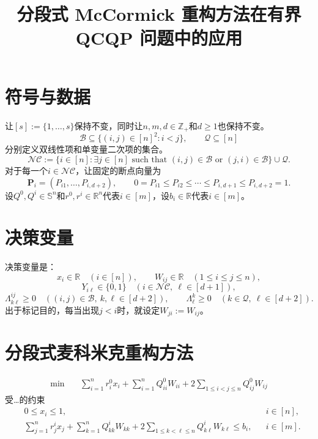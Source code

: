 \documentclass{article}
\title{分段式 McCormick 重构方法在有界 QCQP 问题中的应用}
\author{}
\date{}
\begin{document}
\maketitle

\section*{符号与数据}
让$[s]:=\{1,\ldots,s\}$保持不变，同时让$n,m,d\in\mathbb{Z}_{+}$和$d\geq 1$也保持不变。
\[
\mathcal{B}\subseteq\{(i,j)\in[n]^2:i<j\},
\qquad
\mathcal{Q}\subseteq[n]
\]
分别定义双线性项和单变量二次项的集合。
\[
\mathcal{NC}:=
\bigl\{i\in[n]:\exists j\in[n]\text{ such that }(i,j)\in\mathcal{B}\text{ or }(j,i)\in\mathcal{B}\bigr\}\cup\mathcal{Q}.
\]
对于每一个$i\in\mathcal{NC}$，让固定的断点向量为
\[
\mathbf{P}_i=(P_{i1},\ldots,P_{i,d+2}),
\qquad
0=P_{i1}\leq P_{i2}\leq\cdots\leq P_{i,d+1}\leq P_{i,d+2}=1.
\]
设$Q^0,Q^i\in\mathbb{S}^n$和$r^0,r^i\in\mathbb{R}^n$代表$i\in[m]$，设$b_i\in\mathbb{R}$代表$i\in[m]$。

\section*{决策变量}
决策变量是：
\[
x_i\in\mathbb{R}\quad(i\in[n]),
\qquad
W_{ij}\in\mathbb{R}\quad(1\leq i\leq j\leq n),
\]
\[
Y_{i\ell}\in\{0,1\}\quad(i\in\mathcal{NC},\ \ell\in[d+1]),
\]
\[
\Lambda^{ij}_{k\ell}\geq 0
\quad((i,j)\in\mathcal{B},\ k,\ell\in[d+2]),
\qquad
\Lambda^k_\ell\geq 0
\quad(k\in\mathcal{Q},\ \ell\in[d+2]).
\]
出于标记目的，每当出现$j<i$时，就设定$W_{ji}:=W_{ij}$。

\section*{分段式麦科米克重构方法}
\begin{align}
\min\quad
&\sum_{i=1}^{n}r^0_i x_i
 +\sum_{i=1}^{n}Q^0_{ii}W_{ii}
 +2\sum_{1\leq i<j\leq n}Q^0_{ij}W_{ij}
\label{eq:objective}
\end{align}
受…的约束
\begin{align}
&0\leq x_i\leq 1,
&& i\in[n],
\label{eq:xbounds}\\
&\sum_{j=1}^{n}r^i_jx_j
 +\sum_{k=1}^{n}Q^i_{kk}W_{kk}
 +2\sum_{1\leq k<\ell\leq n}Q^i_{k\ell}W_{k\ell}
 \leq b_i,
&& i\in[m].
\label{eq:baseconstraints}
\end{align}
\end{document}
